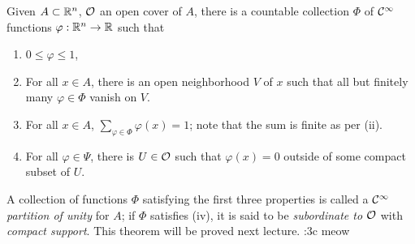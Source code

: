 \begin{simplethm}
    Given $A \subset \mathbb R^n$, $\mathcal O$ an open cover of $A$, there is a countable collection $\Phi$ of $\mathcal C^\infty$ functions $\varphi : \mathbb R^n \to \mathbb R$ such that
    \begin{enumerate}[label=(\roman*)]
        \item $0 \leq \varphi \leq 1$,
        \item For all $x \in A$, there is an open neighborhood $V$ of $x$ such that all but finitely many $\varphi \in \Phi$ vanish on $V$.
        \item For all $x \in A$, $\sum_{\varphi \in \Phi} \varphi(x) = 1$; note that the sum is finite as per (ii).
        \item For all $\varphi \in \Psi$, there is $U \in \mathcal O$ such that $\varphi(x) = 0$ outside of some compact subset of $U$.
    \end{enumerate}
\end{simplethm}
\noindent A collection of functions $\Phi$ satisfying the first three properties is called a $\mathcal C^\infty$ \textit{partition of unity} for $A$; if $\Phi$ satisfies (iv), it is said to be \textit{subordinate to $\mathcal O$} with \textit{compact support}. This theorem will be proved next lecture. :3c meow
